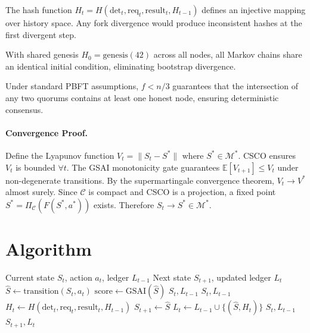\documentclass{article}
\begin{document}
\begin{lemma}
\label{lem:ledger}
The hash function $H_t = H(\text{det}_t, \text{req}_t, \text{result}_t, H_{t-1})$
defines an injective mapping over history space.
Any fork divergence would produce inconsistent hashes at the first
divergent step.
\end{lemma}

\begin{lemma}
\label{lem:genesis}
With shared genesis $H_0 = \text{genesis}(42)$ across all nodes,
all Markov chains share an identical initial condition, eliminating
bootstrap divergence.
\end{lemma}

\begin{lemma}
\label{lem:byzantine}
Under standard PBFT assumptions, $f < n/3$ guarantees that the
intersection of any two quorums contains at least one honest node,
ensuring deterministic consensus.
\end{lemma}

\paragraph{Convergence Proof.}
Define the Lyapunov function $V_t = \|S_t - S^*\|$ where $S^* \in \mathcal{M}^*$.
CSCO ensures $V_t$ is bounded $\forall t$.
The GSAI monotonicity gate guarantees $\mathbb{E}[V_{t+1}] \leq V_t$ under
non-degenerate transitions.
By the supermartingale convergence theorem, $V_t \to V^*$ almost surely.
Since $\mathcal{C}$ is compact and CSCO is a projection, a fixed point
$S^* = \Pi_{\mathcal{C}}(F(S^*, a^*))$ exists.
Therefore $S_t \to S^* \in \mathcal{M}^*$.

\section{Algorithm}

\begin{algorithm}[t]
\caption{DSECS Runtime Step}\label{alg:dsecs}
\begin{algorithmic}[1]
\Require Current state $S_t$, action $a_t$, ledger $L_{t-1}$
\Ensure Next state $S_{t+1}$, updated ledger $L_t$
\State $\hat{S} \gets \text{transition}(S_t, a_t)$
\State $\text{score} \gets \text{GSAI}(\hat{S})$
    \Return $S_t, L_{t-1}$ 
\EndIf
{}
    \Return $S_t, L_{t-1}$ 
\EndIf
\State $H_t \gets H(\text{det}_t, \text{req}_t, \text{result}_t, H_{t-1})$
\State $S_{t+1} \gets \hat{S}$
\State $L_t \gets L_{t-1} \cup \{(\hat{S}, H_t)\}$
    \Return $S_t, L_{t-1}$ 
\EndIf
\Return $S_{t+1}, L_t$
\end{algorithmic}
\end{algorithm}
\end{document}
